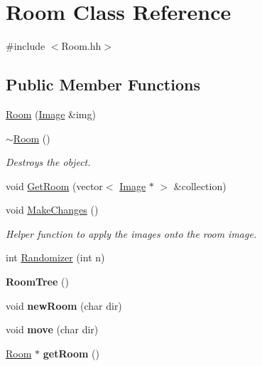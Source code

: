 \hypertarget{classRoom}{\section{Room Class Reference}
\label{classRoom}
}


{\ttfamily \#include $<$Room.\-hh$>$}

\subsection*{Public Member Functions}
\begin{DoxyCompactItemize}
\item 
\hyperlink{classRoom_a755646673335862f28b57d5600b6fd30}{Room} (\hyperlink{classImage}{Image} \&img)
\item 
\hypertarget{classRoom_a67d5da09983cc53097807fd43ba5481a}{\hyperlink{classRoom_a67d5da09983cc53097807fd43ba5481a}{$\sim$\-Room} ()}\label{classRoom_a67d5da09983cc53097807fd43ba5481a}

\begin{DoxyCompactList}\small\item\em Destroys the object. \end{DoxyCompactList}\item 
void \hyperlink{classRoom_a267a11891afd9d608fd47f69c812f0e6}{Get\-Room} (vector$<$ \hyperlink{classImage}{Image} $\ast$ $>$ \&collection)
\item 
\hypertarget{classRoom_a74aefefa4c161799ca709a7f1d681ed2}{void \hyperlink{classRoom_a74aefefa4c161799ca709a7f1d681ed2}{Make\-Changes} ()}\label{classRoom_a74aefefa4c161799ca709a7f1d681ed2}

\begin{DoxyCompactList}\small\item\em Helper function to apply the images onto the room image. \end{DoxyCompactList}\item 
int \hyperlink{classRoom_a40f49471cbd82ece2b78cabbcd576a1f}{Randomizer} (int n)
\item 
\hypertarget{classRoom_ac7cd4e8afbc1de4dab38d0fad286aff8}{{\bfseries Room\-Tree} ()}\label{classRoom_ac7cd4e8afbc1de4dab38d0fad286aff8}

\item 
\hypertarget{classRoom_ae709e7bab6f0baef101a69f91c3f2494}{void {\bfseries new\-Room} (char dir)}\label{classRoom_ae709e7bab6f0baef101a69f91c3f2494}

\item 
\hypertarget{classRoom_aceaa2e1c7c1a8017d51434513a717c47}{void {\bfseries move} (char dir)}\label{classRoom_aceaa2e1c7c1a8017d51434513a717c47}

\item 
\hypertarget{classRoom_a3ce43bc6b9d2fd467160a807e07c8be2}{\hyperlink{classRoom}{Room} $\ast$ {\bfseries get\-Room} ()}\label{classRoom_a3ce43bc6b9d2fd467160a807e07c8be2}

\end{DoxyCompactItemize}


